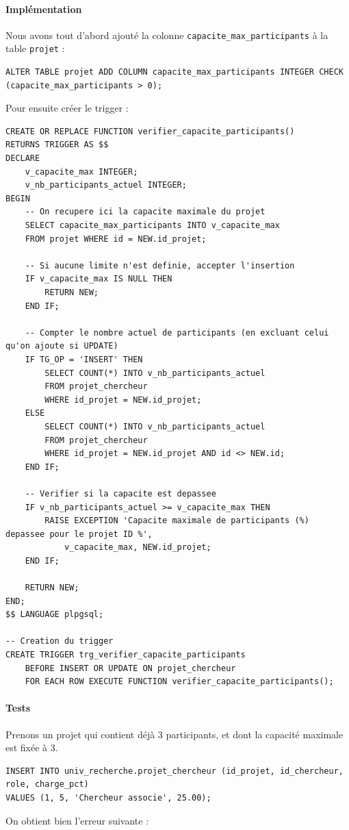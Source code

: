 \documentclass[12pt,a4paper]{article}
\begin{document}
\paragraph{Implémentation}

Nous avons tout d'abord ajouté la colonne \texttt{capacite\_max\_participants} à la table \texttt{projet} :
\begin{lstlisting}[style=sqlstyle, caption=Ajout de la colonne capacité maximale participants]
    ALTER TABLE projet ADD COLUMN capacite_max_participants INTEGER CHECK (capacite_max_participants > 0);
\end{lstlisting}

Pour ensuite créer le trigger :

\begin{lstlisting}[style=sqlstyle, caption=Trigger limite participants]
CREATE OR REPLACE FUNCTION verifier_capacite_participants()
RETURNS TRIGGER AS $$
DECLARE
    v_capacite_max INTEGER;
    v_nb_participants_actuel INTEGER;
BEGIN
    -- On recupere ici la capacite maximale du projet
    SELECT capacite_max_participants INTO v_capacite_max
    FROM projet WHERE id = NEW.id_projet;
    
    -- Si aucune limite n'est definie, accepter l'insertion
    IF v_capacite_max IS NULL THEN
        RETURN NEW;
    END IF;
    
    -- Compter le nombre actuel de participants (en excluant celui qu'on ajoute si UPDATE)
    IF TG_OP = 'INSERT' THEN
        SELECT COUNT(*) INTO v_nb_participants_actuel
        FROM projet_chercheur
        WHERE id_projet = NEW.id_projet;
    ELSE
        SELECT COUNT(*) INTO v_nb_participants_actuel
        FROM projet_chercheur
        WHERE id_projet = NEW.id_projet AND id <> NEW.id;
    END IF;
    
    -- Verifier si la capacite est depassee
    IF v_nb_participants_actuel >= v_capacite_max THEN
        RAISE EXCEPTION 'Capacite maximale de participants (%) depassee pour le projet ID %', 
            v_capacite_max, NEW.id_projet;
    END IF;
    
    RETURN NEW;
END;
$$ LANGUAGE plpgsql;

-- Creation du trigger
CREATE TRIGGER trg_verifier_capacite_participants
    BEFORE INSERT OR UPDATE ON projet_chercheur
    FOR EACH ROW EXECUTE FUNCTION verifier_capacite_participants();

\end{lstlisting}

\paragraph{Tests}
Prenons un projet qui contient déjà 3 participants, et dont la capacité maximale est fixée à 3.
\begin{lstlisting}[style=sqlstyle, caption=Test du trigger limite participants]
INSERT INTO univ_recherche.projet_chercheur (id_projet, id_chercheur, role, charge_pct)
VALUES (1, 5, 'Chercheur associe', 25.00);
\end{lstlisting}
On obtient bien l'erreur suivante :
\end{document}
